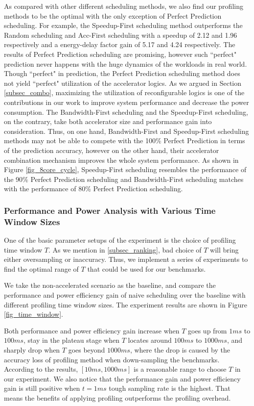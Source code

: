 As compared with other different scheduling methods, we also find our profiling methods to be the optimal with the only exception of Perfect Prediction scheduling. For example, the Speedup-First scheduling method outperforms the Random scheduling and Acc-First scheduling with a speedup of 2.12 and 1.96 respectively and a energy-delay factor gain of 5.17 and 4.24 respectively. The results of Perfect Prediction scheduling are promising, however such ``perfect" prediction never happens with the huge dynamics of the workloads in real world. Though ``perfect" in prediction, the Perfect Prediction scheduling method does not yield ``perfect" utilization of the accelerator logics. As we argued in Section \ref{subsec_combo}, maximizing the utilization of reconfigurable logics is one of the contributions in our work to improve system performance and decrease the power consumption. The Bandwidth-First scheduling and the Speedup-First scheduling, on the contrary, take both accelerator size and performance gain into consideration. Thus, on one hand, Bandwidth-First and Speedup-First scheduling methods may not be able to compete with the 100\% Perfect Prediction in terms of the prediction accuracy, however on the other hand, their accelerator combination mechanism improves the whole system performance. As shown in Figure \ref{fig_8core_cycle}, Speedup-First scheduling resembles the performance of the 90\% Perfect Prediction scheduling and Bandwidth-First scheduling matches with the performance of 80\% Perfect Prediction scheduling. 

\subsubsection{Performance and Power Analysis with Various Time Window Sizes}
One of the basic parameter setups of the experiment is the choice of profiling time window $T$. As we mention in \ref{subsec_ranking}, bad choice of $T$ will bring either oversampling or inaccuracy. Thus, we implement a series of experiments to find the optimal range of $T$ that could be used for our benchmarks. 

We take the non-accelerated scenario as the baseline, and compare the performance and power efficiency gain of naive scheduling over the baseline with different profiling time window sizes. The experiment results are shown in Figure \ref{fig_time_window}.

Both performance and power efficiency gain increase when $T$ goes up from $1 ms$ to $100 ms$, stay in the plateau stage when $T$ locates around $100 ms$ to $1000 ms$, and sharply drop when $T$ goes beyond $1000 ms$, where the drop is caused by the accuracy loss of profiling method when down-sampling the benchmarks. According to the results, $[10 ms, 1000 ms]$ is a reasonable range to choose $T$ in our experiment. We also notice that the performance gain and power efficiency gain is still positive when $t = 1 ms$ tough sampling rate is the highest. That means the benefits of applying profiling outperforms the profiling overhead. 

